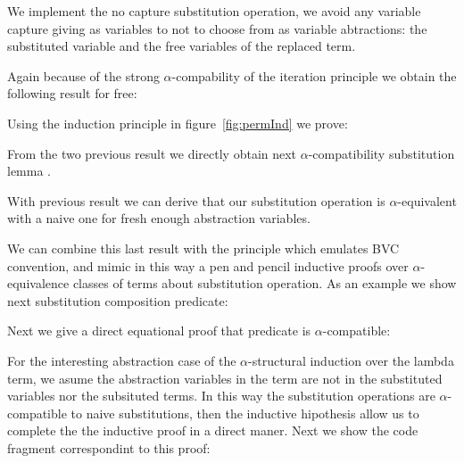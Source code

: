 \documentclass{entcs}
\newcommand{\alp}{\ensuremath{\alpha}}
\begin{document}
We implement the no capture substitution operation, we avoid any variable capture giving as variables to not to choose from as variable abtractions: the substituted variable and the free variables of the replaced term.

 \hspace{5px}

Again because of the strong \alp-compability of the iteration principle we obtain the following result for free:

 \hspace{5px}

Using the induction principle in figure~\ref{fig:permInd} we prove:

 \hspace{5px}

From the two previous result we directly obtain next \alp-compatibility substitution lemma .

 \hspace{5px}

With previous result we can derive that our substitution operation is \alp-equivalent with a naive one for fresh enough abstraction variables.

 \hspace{5px}

We can combine this last result with the  principle which emulates BVC convention, and mimic in this way a pen and pencil inductive proofs over \alp-equivalence classes of terms about substitution operation. As an example we show next substitution composition predicate:

 \hspace{5px}

Next we give a direct equational proof that  predicate is \alp-compatible:

 \hspace{5px}

For the interesting abstraction case of the \alp-structural induction over the lambda term, we asume the abstraction variables in the term are not in the substituted variables nor the subsituted terms. In this way the substitution operations are \alp-compatible to naive substitutions, then the inductive hipothesis allow us to complete the the inductive proof in a direct maner. Next we show the code fragment correspondint to this proof:
 
\end{document}
